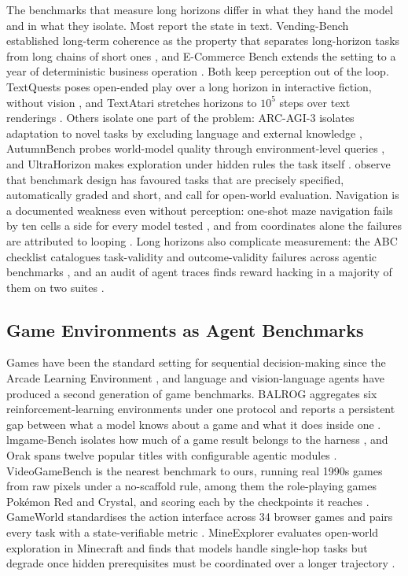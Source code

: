 \documentclass{article} %
\begin{document}
The benchmarks that measure long horizons differ in what they hand the model
and in what they isolate. Most report the state in text. Vending-Bench
established long-term coherence as the property that separates long-horizon
tasks from long chains of short ones \citep{backlund2025vending}, and
E-Commerce Bench extends the setting to a year of deterministic business
operation \citep{fan2026ecommerce}. Both keep perception out of the loop.
TextQuests poses open-ended play over a long horizon in interactive fiction,
without vision \citep{phan2025textquests}, and TextAtari stretches horizons to
$10^5$ steps over text renderings \citep{li2025textatari}. Others isolate one
part of the problem: ARC-AGI-3 isolates adaptation to novel tasks by excluding
language and external knowledge \citep{arc2026arcagi3}, AutumnBench probes
world-model quality through environment-level queries
\citep{warrier2025benchmarking}, and UltraHorizon makes exploration under
hidden rules the task itself \citep{luo2025ultrahorizon}. \citet{kapoor2026openworld}
observe that benchmark design has favoured tasks that are precisely
specified, automatically graded and short, and call for open-world
evaluation. Navigation is a documented weakness even without perception: one-shot maze navigation fails by ten cells a side for every model tested \citep{jiang2026lostaggregation}, and from coordinates alone the failures are attributed to looping \citep{einarsson2025mazeeval}. Long horizons also complicate measurement: the ABC checklist catalogues task-validity and outcome-validity failures across agentic benchmarks \citep{zhu2025establishing}, and an audit of agent traces finds reward hacking in a majority of them on two suites \citep{shao2026validity}.

\subsection{Game Environments as Agent Benchmarks}

Games have been the standard setting for sequential decision-making since the
Arcade Learning Environment \citep{bellemare2013arcade}, and language and
vision-language agents have produced a second generation of game benchmarks.
BALROG aggregates six reinforcement-learning environments under one protocol
and reports a persistent gap between what a model knows about a game and what
it does inside one \citep{paglieri2025balrog}. lmgame-Bench isolates how much
of a game result belongs to the harness \citep{hu2026lmgame}, and Orak spans
twelve popular titles with configurable agentic modules \citep{park2026orak}.
VideoGameBench is the nearest benchmark to ours, running real 1990s games from raw pixels under a no-scaffold rule, among them the role-playing games Pok\'emon Red and Crystal, and scoring each by the checkpoints it reaches \citep{zhang2025videogamebench}.
GameWorld
standardises the action interface across 34 browser games and pairs every
task with a state-verifiable metric \citep{ouyang2026gameworld}. MineExplorer
evaluates open-world exploration in Minecraft and finds that models handle
single-hop tasks but degrade once hidden prerequisites must be coordinated
over a longer trajectory \citep{ju2026mineexplorer}.
\end{document}

